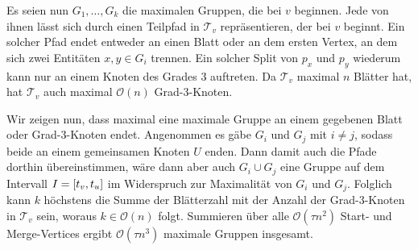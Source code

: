 \begin{beweis}
	Es seien nun $G_1, \ldots ,G_k$ die maximalen Gruppen, die bei $v$ beginnen.
	Jede von ihnen lässt sich durch einen Teilpfad in $\mathcal{T}_v$ repräsentieren, der bei $v$ beginnt.
	Ein solcher Pfad endet entweder an einen Blatt oder an dem ersten Vertex, an dem sich zwei Entitäten $x,y \in G_i$ trennen.
	Ein solcher Split von $p_x$ und $p_y$ wiederum kann nur an einem Knoten des Grades 3 auftreten.
	Da $\mathcal{T}_v$ maximal $n$ Blätter hat, hat $\mathcal{T}_v$ auch maximal $\mathcal{O}(n)$ Grad-3-Knoten.
	
	Wir zeigen nun, dass maximal eine maximale Gruppe an einem gegebenen Blatt oder Grad-3-Knoten endet.
	Angenommen es gäbe $G_i$ und $G_j$ mit $i \neq j$, sodass beide an einem gemeinsamen Knoten $U$ enden.
	Dann damit auch die Pfade dorthin übereinstimmen, wäre dann aber auch $G_i \cup G_j$ eine Gruppe auf dem Intervall $I=\benbrace*{t_v,t_u}$ im Widerspruch zur Maximalität von $G_i$ und $G_j$.
	Folglich kann $k$ höchstens die Summe der Blätterzahl mit der Anzahl der Grad-3-Knoten in $\mathcal{T}_v$ sein, woraus $k \in \mathcal{O}(n)$ folgt.
	Summieren über alle $\mathcal{O}(\tau n^2)$ Start- und Merge-Vertices ergibt $\mathcal{O}(\tau n^3)$ maximale Gruppen insgesamt.
\end{beweis}
